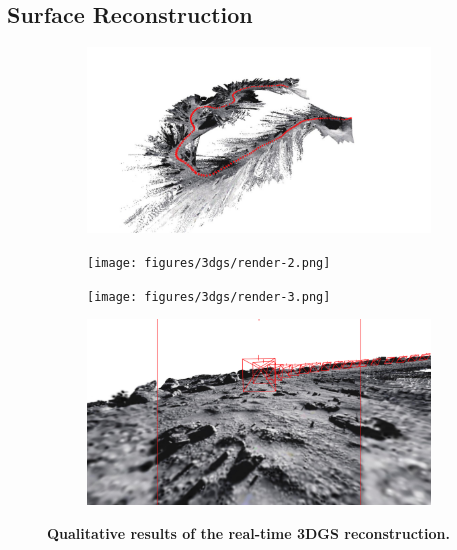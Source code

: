 \subsection{Surface Reconstruction}

\begin{figure}[t!]
	\centering
	\begin{subfigure}[b]{0.48\linewidth}
		\includegraphics[width=\linewidth]{figures/3dgs/render-1.png}
	\end{subfigure}
	\hfill
	\begin{subfigure}[b]{0.48\linewidth}
		\texttt{[image: figures/3dgs/render-2.png]}
	\end{subfigure}
	\vspace{1em}
	\begin{subfigure}[b]{0.48\linewidth}
		\texttt{[image: figures/3dgs/render-3.png]}
	\end{subfigure}
	\hfill
	\begin{subfigure}[b]{0.48\linewidth}
		\includegraphics[width=\linewidth]{figures/3dgs/render-4.png}
	\end{subfigure}
	\caption{\bfseries Qualitative results of the real-time 3DGS reconstruction.}
	\label{fig:surface_recon_qual}
\end{figure}

